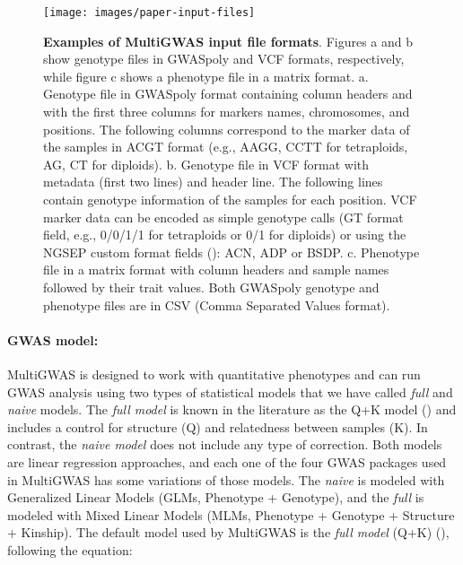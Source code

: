 \documentclass{article}
\begin{document}
\begin{figure}[H]
\begin{centering}
\texttt{[image: images/paper-input-files]}
\par\end{centering}
\caption{\scriptsize \textbf{{Examples of MultiGWAS input file formats}}. Figures a and b show genotype files in GWASpoly and VCF formats, respectively, while figure c shows a phenotype file in a matrix format. a. Genotype file in GWASpoly format containing column headers and with the first three columns for markers names, chromosomes, and positions. The following columns correspond to the marker data of the samples in \textquotedbl{}ACGT\textquotedbl{} format (e.g., AAGG, CCTT for tetraploids, AG, CT for diploids). b. Genotype file in VCF format with metadata (first two lines) and header line. The following lines contain genotype information of the samples for each position. VCF marker data can be encoded as simple genotype calls (GT format field, e.g., 0/0/1/1 for tetraploids or 0/1 for diploids) or using the NGSEP custom format fields (\cite{Duitama2019}): ACN, ADP or BSDP. c. Phenotype file in a matrix format with column headers and sample names followed by their trait values. Both GWASpoly genotype and phenotype files are in CSV (Comma Separated Values format).} \label{fig:File-Formats}\protect 
\end{figure}


\paragraph{GWAS model:}

MultiGWAS is designed to work with quantitative phenotypes and can run GWAS analysis using two types of statistical models that we have called \emph{full} and \emph{naive} models. The \emph{full model} is known in the literature as the Q+K model (\cite{Yu2006}) and includes a control for structure (Q) and relatedness between samples (K). In contrast, the \emph{naive model} does not include any type of correction. Both models are linear regression approaches, and each one of the four GWAS packages used in MultiGWAS has some variations of those models. The \emph{naive} is modeled with Generalized Linear Models (GLMs, Phenotype + Genotype), and the \emph{full} is modeled with Mixed Linear Models (MLMs, Phenotype + Genotype + Structure + Kinship). The default model used by MultiGWAS is the \emph{full model} (Q+K) (\cite{Yu2006}), following the equation:
\end{document}
